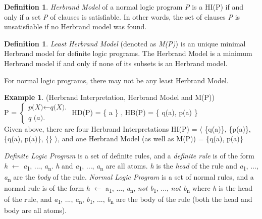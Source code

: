 \documentclass[12pt,twoside]{report}
\theoremstyle{plain}
\theoremstyle{definition}
\newtheorem{defn}[thm]{Definition} %
\newtheorem{examp}{Example}[section]
\begin{document}
\begin{defn}
\textit{Herbrand Model} of a normal logic program  \textit{P} is a HI(P) if and only if a set \textit{P} of clauses is satisfiable. In other words, the set of clauses \textit{P} is unsatisfiable if no Herbrand model was found.
\end{defn}

\begin{defn}
\textit{Least Herbrand Model} (denoted as \textit{M(P)}) is an unique minimal Herbrand model for definite logic programs.  The Herbrand Model is a minimum Herbrand model if and only if none of its subsets is an Herbrand model.
\end{defn}
For normal logic programs, there may not be any least Herbrand Model.


\begin{examp} \normalfont (Herbrand Interpretation, Herbrand Model and M(P)) \\

P = $\begin{cases}
	\textit{p(X)}  \leftarrow \textit{q(X).} \\
	\textit{q (a).}
      \end{cases}$
HD(P) = \{ a \} , HB(P) = \{ q(a), p(a) \}  \\

Given above,  there are four Herbrand Interpretations HI(P) = $\langle$ \{q(a)\}, \{p(a)\}, \{q(a), p(a)\}, \{\} $\rangle$, and one Herbrand Model (as well as M(P)) = \{q(a), p(a)\}

\end{examp}

\textit{Definite Logic Program} is a set of definite rules, and  a \textit{definite rule} is of the form \textit{h} $\leftarrow$ \textit{a}\textsubscript{1}, ..., \textit{a}\textsubscript{n}.  \textit{h} and  \textit{a}\textsubscript{1}, ..., \textit{a}\textsubscript{n} are all atoms. \textit{h} is the \textit{head} of the rule and \textit{a}\textsubscript{1}, ..., \textit{a}\textsubscript{n} are the \textit{body} of the rule.
\textit{Normal Logic Program} is a set of normal rules, and a normal rule is of the form \textit{h} $\leftarrow$ a\textsubscript{1}, ..., \textit{a}\textsubscript{n}, \textit{not b}\textsubscript{1}, ..., \textit{not  b}\textsubscript{n} where \textit{h} is the head of the rule,
 and \textit{a}\textsubscript{1}, ..., \textit{a}\textsubscript{n}, \textit{b}\textsubscript{1}, ..., \textit{b}\textsubscript{n} are the body of the rule (both the head and body are all atoms).
\end{document}
